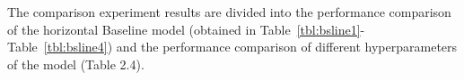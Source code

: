 





The comparison experiment results are divided into the performance comparison of the horizontal Baseline model (obtained in Table~\ref{tbl:bsline1}-Table~\ref{tbl:bsline4}) and the performance comparison of different hyperparameters of the model (Table 2.4).

